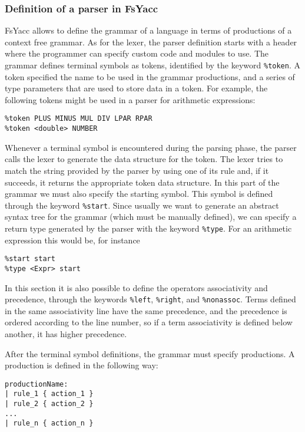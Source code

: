 \subsubsection{Definition of a parser in FsYacc}
FsYacc allows to define the grammar of a language in terms of productions of a context free grammar. As for the lexer, the parser definition starts with a header where the programmer can specify custom code and modules to use. The grammar defines terminal symbols as tokens, identified by the keyword \texttt{\%token}. A token specified the name to be used in the grammar productions, and a series of type parameters that are used to store data in a token. For example, the following tokens might be used in a parser for arithmetic expressions:

\begin{lstlisting}
%token PLUS MINUS MUL DIV LPAR RPAR
%token <double> NUMBER
\end{lstlisting}

\noindent
Whenever a terminal symbol is encountered during the parsing phase, the parser calls the lexer to generate the data structure for the token. The lexer tries to match the string provided by the parser by using one of its rule and, if it succeeds, it returns the appropriate token data structure. In this part of the grammar we must also specify the starting symbol. This symbol is defined through the keyword \texttt{\%start}. Since usually we want to generate an abstract syntax tree for the grammar (which must be manually defined), we can specify a return type generated by the parser with the keyword \texttt{\%type}. For an arithmetic expression this would be, for instance

\begin{lstlisting}
%start start
%type <Expr> start 
\end{lstlisting}

\noindent
In this section it is also possible to define the operators associativity and precedence, through the keywords \texttt{\%left}, \texttt{\%right}, and \texttt{\%nonassoc}. Terms defined in the same associativity line have the same precedence, and the precedence is ordered according to the line number, so if a term associativity is defined below another, it has higher precedence.

After the terminal symbol definitions, the grammar must specify productions. A production is defined in the following way:

\begin{lstlisting}
productionName:
| rule_1 { action_1 }
| rule_2 { action_2 }
...
| rule_n { action_n }
\end{lstlisting}

